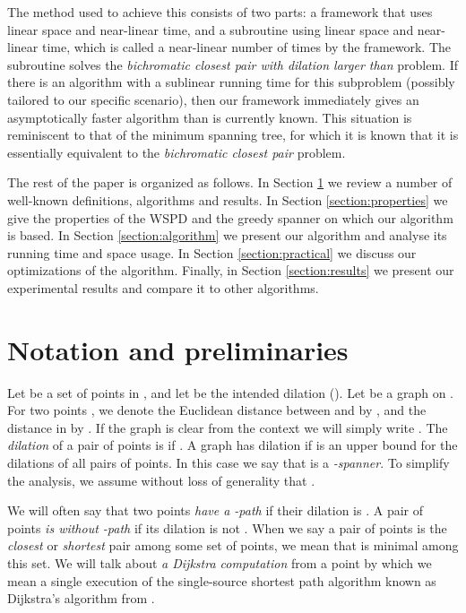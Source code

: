 \documentclass[runningheads,envcountsame,oribibl,orivec]{llncs}
\begin{document}
The method used to achieve this consists of two parts: a framework that uses linear space and near-linear time, and a subroutine using linear space and near-linear time, which is called a near-linear number of times by the framework. The subroutine solves the \emph{bichromatic closest pair with dilation larger than } problem. If there is an algorithm with a sublinear running time for this subproblem (possibly tailored to our specific scenario), then our framework immediately gives an asymptotically faster algorithm than is currently known. This situation is reminiscent to that of the minimum spanning tree, for which it is known that it is essentially equivalent to the \emph{bichromatic closest pair} problem.

The rest of the paper is organized as follows. In Section \ref{section:preliminaries} we review a number of well-known definitions, algorithms and results. In Section \ref{section:properties} we give the properties of the WSPD and the greedy spanner on which our algorithm is based.
In Section \ref{section:algorithm} we present our algorithm and analyse its running time and space usage. In Section \ref{section:practical} we discuss our optimizations of the algorithm. Finally, in Section \ref{section:results} we present our experimental results and compare it to other algorithms.

\section{Notation and preliminaries} \label{section:preliminaries}

Let  be a set of points in , and let  be the intended dilation (). Let  be a graph on . For two points , we denote the Euclidean distance between  and  by , and the distance in  by . If the graph  is clear from the context we will simply write . The \emph{dilation} of a pair of points is  if . A graph  has dilation  if  is an upper bound for the dilations of all pairs of points. In this case we say that  is a \emph{-spanner}. To simplify the analysis, we assume without loss of generality that .

We will often say that two points  \emph{have a -path} if their dilation is . A pair of points \emph{is without -path} if its dilation is not . When we say a pair of points  is the \emph{closest} or \emph{shortest} pair among some set of points, we mean that  is minimal among this set. We will talk about \emph{a Dijkstra computation} from a point  by which we mean a single execution of the single-source shortest path algorithm known as Dijkstra's algorithm from .
\end{document}

